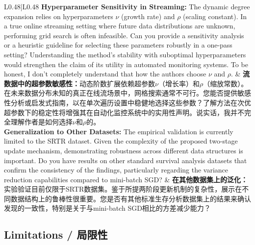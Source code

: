 \documentclass[10pt,a4paper]{article}
\begin{document}
\begin{longtable}{L{0.48\textwidth}|L{0.48\textwidth}}
\hline
\textbf{Hyperparameter Sensitivity in Streaming:} The dynamic degree expansion relies on hyperparameters $\nu$ (growth rate) and $\rho$ (scaling constant). In a true online streaming setting where future data distributions are unknown, performing grid search is often infeasible. Can you provide a sensitivity analysis or a heuristic guideline for selecting these parameters robustly in a one-pass setting? Understanding the method's stability with suboptimal hyperparameters would strengthen the claim of its utility in automated monitoring systems. To be honest, I don't completely understand that how the authors choose $\nu$ and $\rho$.
&
\textbf{流数据中的超参数敏感性：}动态阶数扩展依赖超参数$\nu$（增长率）和$\rho$（缩放常数）。在未来数据分布未知的真正在线流场景中，网格搜索通常不可行。您能否提供敏感性分析或启发式指南，以在单次遍历设置中稳健地选择这些参数？了解方法在次优超参数下的稳定性将增强其在自动化监控系统中的实用性声明。说实话，我并不完全理解作者是如何选择$\nu$和$\rho$的。 \\
\hline
\textbf{Generalization to Other Datasets:} The empirical validation is currently limited to the SRTR dataset. Given the complexity of the proposed two-stage update mechanism, demonstrating robustness across different data structures is important. Do you have results on other standard survival analysis datasets that confirm the consistency of the findings, particularly regarding the variance reduction capabilities compared to mini-batch SGD?
&
\textbf{在其他数据集上的泛化：}实验验证目前仅限于SRTR数据集。鉴于所提两阶段更新机制的复杂性，展示在不同数据结构上的鲁棒性很重要。您是否有其他标准生存分析数据集上的结果来确认发现的一致性，特别是关于与mini-batch SGD相比的方差减少能力？ \\
\hline
\end{longtable}

\subsection{Limitations / 局限性}
\end{document}
